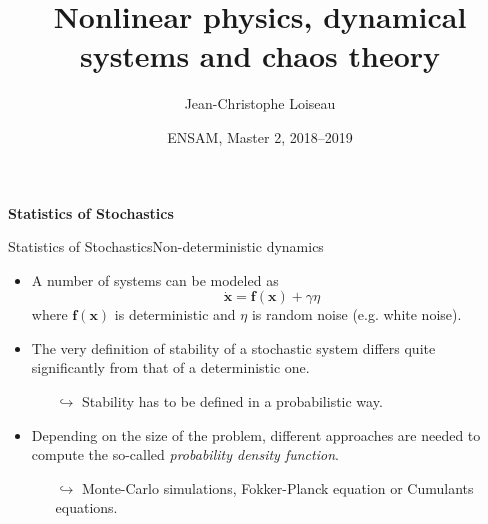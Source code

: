 \documentclass[usenames,dvipsnames,svgnames,10pt,aspectratio=169]{beamer}
\title[Nonlinear Physics] %
{
	Nonlinear physics, dynamical \\ systems and chaos theory
}
\author[J.-Ch.~Loiseau] %
{
	Jean-Christophe Loiseau
}
\institute[unused]
{
	\url{jean-christophe.loiseau@ensam.eu} \\
	DynFluid, \\
	Arts et M\'etiers ParisTech, France
}
\date[unused]{ENSAM, Master 2, 2018--2019}
\begin{document}
\titleframe %




\begin{frame}[t, c]{}
	\centering
	\vspace{1cm}

	{\Large \textbf{Statistics of Stochastics}}

	\bigskip

	{}

\end{frame}

\begin{frame}[t, c]{Statistics of Stochastics}{Non-deterministic dynamics}
	\centering

	\begin{itemize}
		\item A number of systems can be modeled as
		$$
		\dot{ \bm{x} } = \bm{f}(\bm{x}) + \gamma \eta
		$$
		where $\bm{f}(\bm{x})$ is deterministic and $\eta$ is random noise (e.g. white noise).

		\medskip

		\item The very definition of stability of a stochastic system differs quite significantly from that of a deterministic one.
		\begin{itemize}
			\item[$\hookrightarrow$] Stability has to be defined in a probabilistic way.
		\end{itemize}

		\medskip

		\item Depending on the size of the problem, different approaches are needed to compute the so-called \emph{probability density function}.
		\begin{itemize}
			\item[$\hookrightarrow$] Monte-Carlo simulations, Fokker-Planck equation or Cumulants equations.
		\end{itemize}
	\end{itemize}

	\vspace{1cm}
\end{frame}
\end{document}
